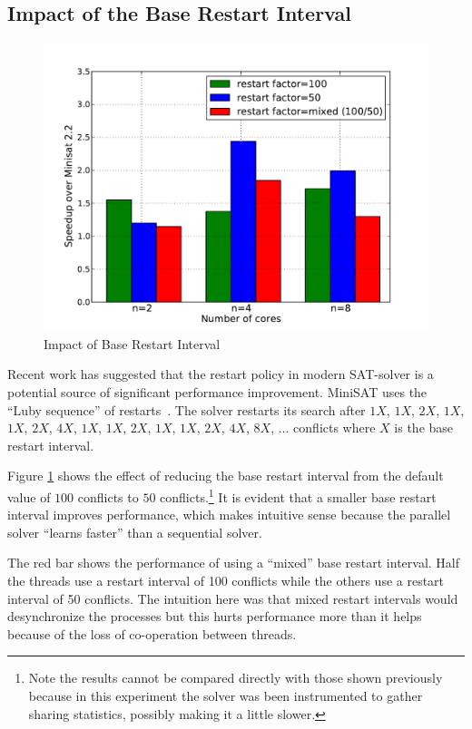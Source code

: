 \documentclass[letterpaper, compsoc, conference]{IEEEtran}
\begin{document}
\subsection{Impact of the Base Restart Interval}

\begin{figure}[htbp]
  \includegraphics[width=\columnwidth]{images/restart_speedup1.pdf}
  \caption{Impact of Base Restart Interval}
  \label{fig:restart}
\end{figure}

Recent work \cite{HuangRestart2007} has suggested that the restart policy in
modern SAT-solver is a potential source of significant performance improvement.
MiniSAT uses the ``Luby sequence'' of restarts~\cite{Luby93optimalspeedup}. The
solver restarts its search after $1X$, $1X$, $2X$, $1X$, $1X$, $2X$, $4X$,
$1X$, $1X$, $2X$, $1X$, $1X$, $2X$, $4X$, $8X$, $\dots$ conflicts where $X$ is
the base restart interval. 

Figure \ref{fig:restart} shows the effect of reducing the base restart interval
from the default value of $100$ conflicts to $50$ conflicts.\footnote{Note the
results cannot be compared directly with those shown previously because in this
experiment the solver was been instrumented to gather sharing statistics,
possibly making it a little slower.} It is evident that a smaller base restart
interval improves performance, which makes intuitive sense because the parallel
solver ``learns faster'' than a sequential solver. 

The red bar shows the performance of using a ``mixed'' base restart interval.
Half the threads use a restart interval of 100 conflicts while the others use a
restart interval of 50 conflicts. The intuition here was that mixed restart
intervals would desynchronize the processes but this hurts performance more
than it helps because of the loss of co-operation between threads.
\end{document}
